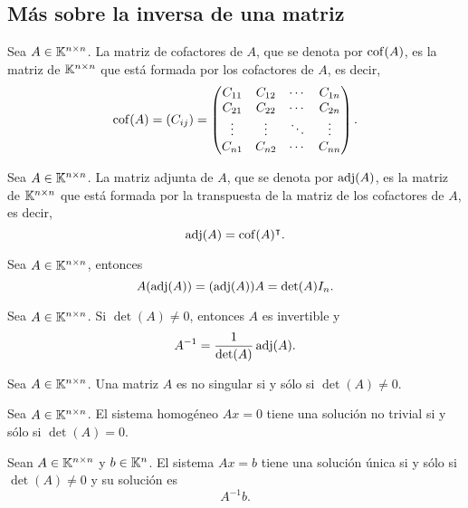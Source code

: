 \documentclass[a4,11pt]{aleph-notas}
\begin{document}
\subsection{Más sobre la inversa de una matriz}

\begin{defi}
    Sea $A \in \Mat[\K]{n}{n}$. La matriz de cofactores de $A$, que se denota por $\cof(A)$, es la matriz de $\Mat[\K]{n}{n}$ que está formada por los cofactores de $A$, es decir, 
    \[
        \cof(A) = (C_{ij}) = 
        \begin{pmatrix}
          C_{11} & C_{12} & \cdots & C_{1n} \\
          C_{21} & C_{22} & \cdots & C_{2n} \\
          \vdots & \vdots & \ddots &\vdots  \\
          C_{n1} & C_{n2} & \cdots & C_{nn}
        \end{pmatrix}.
    \]
\end{defi}


\begin{defi}
    Sea $A \in \Mat[\K]{n}{n}$. La matriz adjunta de $A$, que se denota por $\adj(A)$, es la matriz de $\Mat[\K]{n}{n}$ que está formada por la transpuesta de la matriz de los cofactores de $A$, es decir, 
    \[
        \adj(A) = \cof(A)^\intercal.
    \]
\end{defi}

\begin{teo}
    Sea $A \in \Mat[\K]{n}{n}$, entonces
    \[
        A (\adj(A)) = (\adj(A))A = \det(A)I_n.
    \]
\end{teo}

\begin{cor}
    Sea $A \in \Mat[\K]{n}{n}$. Si $\det(A) \neq 0$, entonces $A$ es invertible y
    \[
        A^{-1} = \dfrac{1}{\det(A)} \adj(A).
    \]
\end{cor}

\begin{teo}
    Sea $A \in \Mat[\K]{n}{n}$. Una matriz $A$ es no singular si y sólo si $\det(A) \neq 0$.
\end{teo}

\begin{teo}
    Sea $A \in \Mat[\K]{n}{n}$. El sistema homogéneo $Ax = 0$ tiene una solución no trivial si y sólo si $\det(A) = 0$.
\end{teo}

\begin{teo}
    Sean $A \in \Mat[\K]{n}{n}$ y $b\in\K^n$. El sistema $Ax = b$ tiene una solución única si y sólo si $\det(A) \neq 0$ y su solución es
    \[
        A^{-1}b.
    \]
\end{teo}
\end{document}

